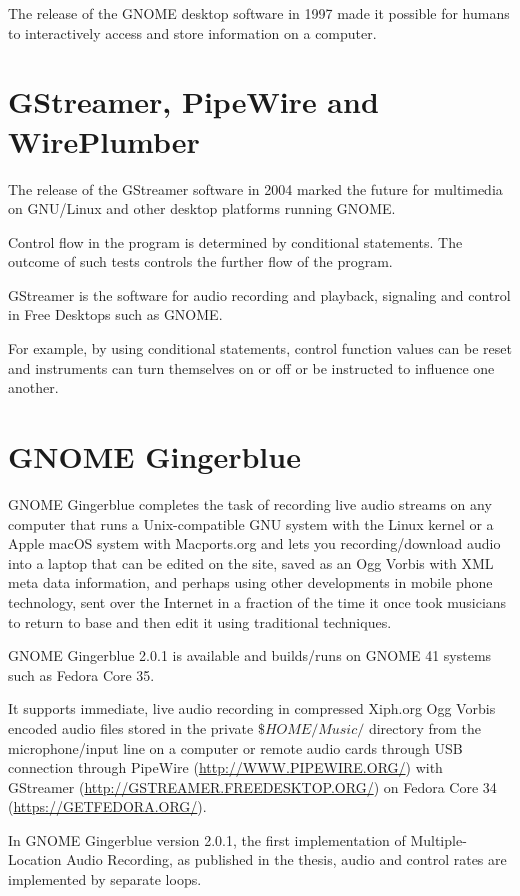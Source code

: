 \documentclass[UKenglish]{ifimaster}  %
\begin{document}
The release of the GNOME desktop software in 1997 made it possible for
humans to interactively access and store information on a computer.

\section{GStreamer, PipeWire and WirePlumber}

The release of the GStreamer software in 2004 marked the future
for multimedia on GNU/Linux and other desktop platforms running
GNOME.

Control flow in the program is determined by conditional statements.
The outcome of such tests controls the further flow of the program.

GStreamer is the software for audio recording and playback, signaling
and control in Free Desktops such as GNOME.

For example, by using conditional statements, control function values
can be reset and instruments can turn themselves on or off or be
instructed to influence one another.

\section{GNOME Gingerblue}

GNOME Gingerblue completes the task of recording live audio streams on
any computer that runs a Unix-compatible GNU system with the Linux
kernel or a Apple macOS system with Macports.org and lets you
recording/download audio into a laptop that can be edited on the site,
saved as an Ogg Vorbis with XML meta data information, and perhaps
using other developments in mobile phone technology, sent over the
Internet in a fraction of the time it once took musicians to return to
base and then edit it using traditional techniques.

GNOME Gingerblue 2.0.1 is available and builds/runs on GNOME 41
systems such as Fedora Core 35.

It supports immediate, live audio recording in compressed Xiph.org Ogg
Vorbis encoded audio files stored in the private $\$HOME/Music/$
directory from the microphone/input line on a computer or remote audio
cards through USB connection through PipeWire
(\url{http://WWW.PIPEWIRE.ORG/}) with GStreamer
(\url{http://GSTREAMER.FREEDESKTOP.ORG/}) on Fedora Core 34
(\url{https://GETFEDORA.ORG/}).

In GNOME Gingerblue version 2.0.1, the first implementation of
Multiple-Location Audio Recording, as published in the thesis, audio
and control rates are implemented by separate loops.
\end{document}
